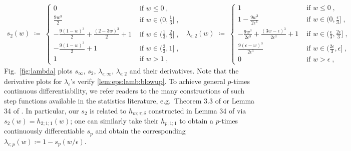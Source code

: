 \begin{align*}
    s_2(w) \;\coloneqq\; 
    \begin{cases}
        0 & \text{ if } w \leq 0\;, 
        \\
        \frac{9w^3}{2} & \text{ if } w \in (0,\frac{1}{3}]\;, 
        \\
        - \frac{9(1-w)^3}{2} + \frac{(2-3w)^3}{2} + 1 & \text{ if } w \in (\frac{1}{3},\frac{2}{3}]\;, 
        \\
        - \frac{9(1-w)^3}{2} + 1 & \text{ if } w \in (\frac{2}{3},1]\;, 
        \\
        1 & \text{ if } w > 1 \;,
    \end{cases}
    \;\;
    \lambda_{\epsilon;2}(w) \;\coloneqq\; 
    \begin{cases}
        1 & \text{ if } w \leq 0\;, 
        \\
        1 - \frac{9w^3}{2\epsilon^3} & \text{ if } w \in (0,\frac{\epsilon}{3}]\;, 
        \\
        - \frac{9 w^3}{2 \epsilon^3} + \frac{(3w - \epsilon )^3}{2 \epsilon^3} + 1  & \text{ if } w \in (\frac{\epsilon}{3},\frac{2\epsilon}{3}]\;, 
        \\
        \frac{9(\epsilon - w)^3}{2 \epsilon^3}  & \text{ if } w \in (\frac{2\epsilon}{3}, \epsilon]\;, 
        \\
        0 & \text{ if } w > \epsilon \;,
    \end{cases}
\end{align*}
Fig.~\ref{fig:lambda} plots $s_\infty$, $s_2$, $\lambda_{\epsilon;\infty}$, $\lambda_{\epsilon;2}$ and their derivatives. Note that the derivative plots for $\lambda_\epsilon$'s verify \cref{lem:eps:lamb:blowup}. To achieve general $p$-times continuous differentiability, we refer readers to the many constructions of such step functions available in the statistics literature, e.g.~Theorem 3.3 of \citet{chen2011normal} or Lemma 34 of \citet{huang2023high}. In particular, our $s_2$ is related to $h_{m;\tau;\delta}$ constructed in Lemma 34 of \citet{huang2023high} via $s_2(w) = h_{2;1;1}(w)$; one can similarly take their $h_{p;1;1}$ to obtain a $p$-times continuously differentiable $s_p$ and obtain the corresponding $\lambda_{\epsilon;p}(w) \coloneqq 1 - s_p(w/\epsilon)$.


